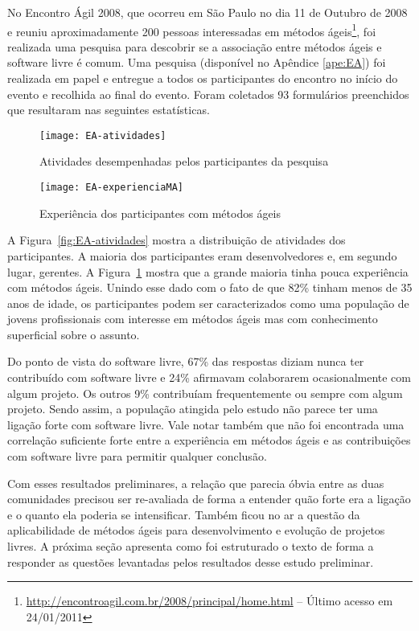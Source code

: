 No Encontro Ágil 2008, que ocorreu em São Paulo no dia 11 de Outubro
de 2008 e reuniu aproximadamente 200 pessoas interessadas em métodos
ágeis\footnote{\url{http://encontroagil.com.br/2008/principal/home.html}
  -- Último acesso em 24/01/2011}, foi realizada uma pesquisa para
descobrir se a associação entre métodos ágeis e software livre é
comum. Uma pesquisa (disponível no Apêndice \ref{ape:EA}) foi
realizada em papel e entregue a todos os participantes do encontro no
início do evento e recolhida ao final do evento. Foram coletados 93
formulários preenchidos que resultaram nas seguintes estatísticas.

\begin{figure}[htb]
  \begin{minipage}[t]{0.5\linewidth}
    \centering
    \texttt{[image: EA-atividades]}
    \caption{Atividades desempenhadas pelos participantes da pesquisa}
    \label{fig:EA-atividades}
  \end{minipage}
  \begin{minipage}[t]{0.5\linewidth}
    \centering
    \texttt{[image: EA-experienciaMA]}
    \caption{Experiência dos participantes com métodos ágeis}
    \label{fig:EA-experienciaMA}
  \end{minipage}
\end{figure}

A Figura~\ref{fig:EA-atividades} mostra a distribuição de atividades
dos participantes. A maioria dos participantes eram desenvolvedores e,
em segundo lugar, gerentes. A Figura~\ref{fig:EA-experienciaMA} mostra
que a grande maioria tinha pouca experiência com métodos ágeis. Unindo
esse dado com o fato de que 82\% tinham menos de 35 anos de idade, os
participantes podem ser caracterizados como uma população de jovens
profissionais com interesse em métodos ágeis mas com conhecimento
superficial sobre o assunto.

Do ponto de vista do software livre, 67\% das respostas diziam nunca
ter contribuído com software livre e 24\% afirmavam colaborarem
ocasionalmente com algum projeto. Os outros 9\% contribuíam
frequentemente ou sempre com algum projeto.  Sendo assim, a população
atingida pelo estudo não parece ter uma ligação forte com software
livre. Vale notar também que não foi encontrada uma correlação
suficiente forte entre a experiência em métodos ágeis e as
contribuições com software livre para permitir qualquer conclusão.

Com esses resultados preliminares, a relação que parecia óbvia entre
as duas comunidades precisou ser re-avaliada de forma a entender quão
forte era a ligação e o quanto ela poderia se intensificar. Também
ficou no ar a questão da aplicabilidade de métodos ágeis para
desenvolvimento e evolução de projetos livres. A próxima seção
apresenta como foi estruturado o texto de forma a responder as
questões levantadas pelos resultados desse estudo preliminar.

